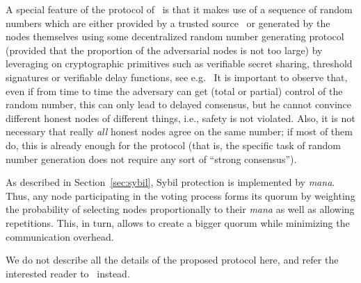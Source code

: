 \documentclass[../main.tex]{subfiles}
\begin{document}
A special feature of the protocol of~\cite{popov2019} is that it makes 
use of a sequence of random numbers which are either
provided by a trusted source~\cite{nist:2019} or generated
by the nodes themselves using some
decentralized random number generating protocol 
(provided that the proportion of the adversarial nodes is not too large) 
by leveraging on cryptographic primitives such as verifiable secret sharing, 
threshold signatures or verifiable delay functions,
see e.g.~\cite{cascudo2017, popov2017, schindler2018, syta2017, boneh:2018}
It is important to observe that,
even if from time to time the adversary can get
(total or partial) control 
of the random number, this can only lead to delayed consensus,
but he cannot convince different honest nodes of different 
things, i.e., safety is not violated.
Also, it is not necessary that really \emph{all}
honest nodes agree on the same number; if most 
of them do, this is already enough for the 
protocol (that is, the specific task
of random number generation does not require
any sort of ``strong consensus'').

As described in Section~\ref{sec:sybil}, Sybil protection is implemented by \emph{mana}.
Thus, any node participating in the voting process forms its quorum by weighting 
the probability of selecting nodes proportionally to their \emph{mana} as well as allowing repetitions. 
This, in turn, allows to create a bigger quorum while minimizing the communication overhead.

We do not describe all the details of the proposed
protocol here, and refer the interested reader to~\cite{popov2019} instead.
\end{document}
